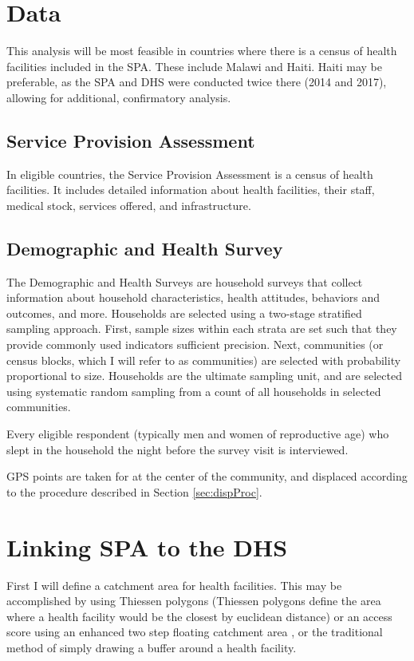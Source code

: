 \section{Data}

This analysis will be most feasible in countries where there is a census of health facilities included in the SPA. These include Malawi and Haiti. Haiti may be preferable, as the SPA and DHS were conducted twice there (2014 and 2017), allowing for additional, confirmatory analysis.

\subsection{Service Provision Assessment}

In eligible countries, the Service Provision Assessment is a census of health facilities. It includes detailed information about health facilities, their staff, medical stock, services offered, and infrastructure.

\subsection{Demographic and Health Survey}

The Demographic and Health Surveys are household surveys that collect information about household characteristics, health attitudes, behaviors and outcomes, and more. Households are selected using a two-stage stratified sampling approach. First, sample sizes within each strata are set such that they provide commonly used indicators sufficient precision. Next, communities (or census blocks, which I will refer to as communities) are selected with probability proportional to size. Households are the ultimate sampling unit, and are selected using systematic random sampling from a count of all households in selected communities.

Every eligible respondent (typically men and women of reproductive age) who slept in the household the night before the survey visit is interviewed.

GPS points are taken for at the center of the community, and displaced according to the procedure described in Section \ref{sec:dispProc}.

\section{Linking SPA to the DHS}
\label{sec:linking}

First I will define a catchment area for health facilities. This may be accomplished by using Thiessen polygons (Thiessen polygons define the area where a health facility would be the closest by euclidean distance) or an access score using an enhanced two step floating catchment area \autocite{gao_understanding_2019-1}, or the traditional method of simply drawing a buffer around a health facility.

